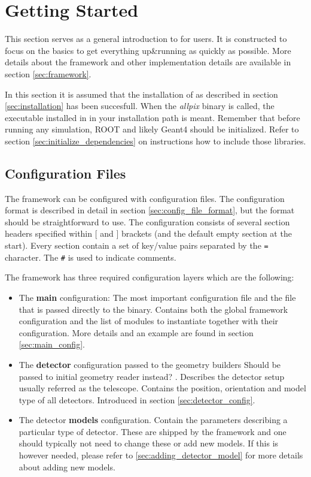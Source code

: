 \section{Getting Started}
This section serves as a general introduction to \apsq for users. It is constructed to focus on the basics to get everything up\&running as quickly as possible. More details about the framework and other implementation details are available in section \ref{sec:framework}.

In this section it is assumed that the installation of \apsq as described in section \ref{sec:installation} has been succesfull. When the \textit{allpix} binary is called, the executable installed in  in your installation path is meant. Remember that before running any \apsq simulation, ROOT and likely Geant4 should be initialized. Refer to section \ref{sec:initialize_dependencies} on instructions how to include those libraries.

\subsection{Configuration Files}
\label{sec:configuration_files}
The framework can be configured with configuration files. The configuration format is described in detail in section \ref{sec:config_file_format}, but the format should be straightforward to use. The configuration consists of several section headers specified within $[$ and $]$ brackets (and the default empty section at the start). Every section contain a set of key/value pairs separated by the \texttt{=} character. The \texttt{\#} is used to indicate comments.

The framework has three required configuration layers which are the following:
\begin{itemize}
\item The \textbf{main} configuration: The most important configuration file and the file that is passed directly to the binary. Contains both the global framework configuration and the list of modules to instantiate together with their configuration. More details and an example are found in section \ref{sec:main_config}.
\item The \textbf{detector} configuration passed to the geometry builders \todo Should be passed to initial geometry reader instead? \todo. Describes the detector setup usually referred as the telescope. Contains the position, orientation and model type of all detectors. Introduced in section \ref{sec:detector_config}.
\item The detector \textbf{models} configuration. Contain the parameters describing a particular type of detector. These are shipped by the framework and one should typically not need to change these or add new models. If this is however needed, please refer to \ref{sec:adding_detector_model} for more details about adding new models.
\end{itemize}

